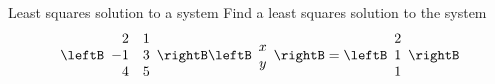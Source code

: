 \begin{example}{Least squares solution to a system}{}
Find a least squares solution to the system 
\begin{equation*}
\leftB
\begin{array}{rr}
2 & 1 \\ 
-1 & 3 \\ 
4 & 5
\end{array}
\rightB \leftB 
\begin{array}{c}
x \\ 
y
\end{array}
\rightB =\leftB 
\begin{array}{c}
2 \\ 
1 \\ 
1
\end{array}
\rightB
\end{equation*}
\end{example}

